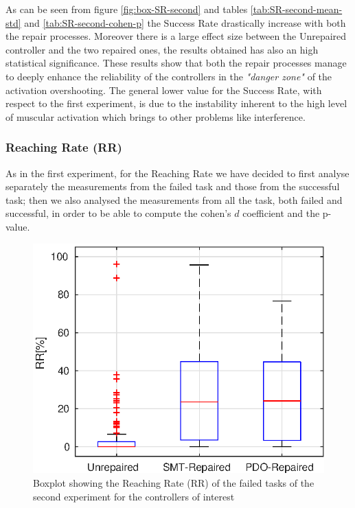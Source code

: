 As can be seen from figure \ref{fig:box-SR-second} and tables \ref{tab:SR-second-mean-std} and \ref{tab:SR-second-cohen-p} the Success Rate drastically increase with both the repair processes. Moreover there is a large effect size between the Unrepaired controller and the two repaired ones, the results obtained has also an high statistical significance. These results show that both the repair processes manage to deeply enhance the reliability of the controllers in the \textit{"danger zone"} of the activation overshooting. The general lower value for the Success Rate, with respect to the first experiment, is due to the instability inherent to the high level of muscular activation which brings to other problems like interference.
%
%
%
%
%
\subsubsection{Reaching Rate (RR)}\label{subsub:second-RR}
As in the first experiment, for the Reaching Rate we have decided to first analyse separately the measurements from the failed task and those from the successful task; then we also analysed the measurements from all the task, both failed and successful, in order to be able to compute the cohen's $d$ coefficient and the p-value.\\
%
%
\begin{figure}[H]
    \centering
    \includegraphics[width=\textwidth]{Images/second-experiment/exp1_RR_fail_box.eps}
    \caption{Boxplot showing the Reaching Rate (RR) of the failed tasks of the second experiment for the controllers of interest}
    \label{fig:box-RR-fail-second}
\end{figure}
